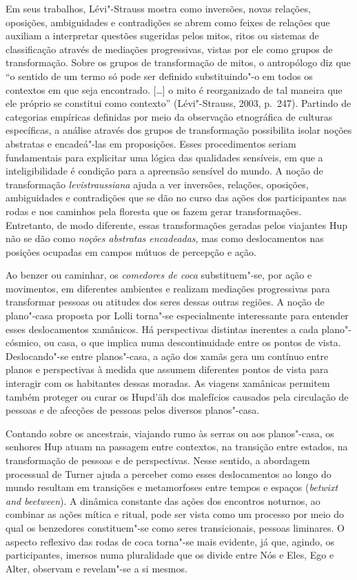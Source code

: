 Em seus trabalhos, Lévi"-Strauss mostra como inversões, novas relações,
oposições, ambiguidades e contradições se abrem como feixes de relações
que auxiliam a interpretar questões sugeridas pelos mitos, ritos ou
sistemas de classificação através de mediações progressivas, vistas por
ele como grupos de transformação. Sobre os grupos de transformação de
mitos, o antropólogo diz que ``o sentido de um termo só pode ser
definido substituindo"-o em todos os contextos em que seja encontrado.
{[}\ldots{}{]} o mito é reorganizado de tal maneira que ele próprio se
constitui como contexto'' (Lévi"-Strauss, 2003, p.~247). Partindo de
categorias empíricas definidas por meio da observação etnográfica de
culturas específicas, a análise através dos grupos de transformação
possibilita isolar noções abstratas e encadeá"-las em proposições. Esses
procedimentos seriam fundamentais para explicitar uma lógica das
qualidades sensíveis, em que a inteligibilidade é condição para a
apreensão sensível do mundo. A noção de transformação \textit{levistraussiana}
ajuda a ver inversões, relações, oposições, ambiguidades e contradições
que se dão no curso das ações dos participantes nas rodas e nos caminhos
pela floresta que os fazem gerar transformações. Entretanto, de modo
diferente, essas transformações geradas pelos viajantes Hup não se dão
como \textit{noções abstratas encadeadas}, mas como deslocamentos nas
posições ocupadas em campos mútuos de percepção e ação.

Ao benzer ou caminhar, os \textit{comedores de coca} substituem"-se, por ação
e movimentos, em diferentes ambientes e realizam mediações progressivas
para transformar pessoas ou atitudes dos seres dessas outras regiões. A
noção de plano"-casa proposta por Lolli torna"-se especialmente
interessante para entender esses deslocamentos xamânicos. Há
perspectivas distintas inerentes a cada plano"-cósmico, ou casa, o que
implica numa descontinuidade entre os pontos de vista. Deslocando"-se
entre planos"-casa, a ação dos xamãs gera um contínuo entre planos e
perspectivas à medida que assumem diferentes pontos de vista para
interagir com os habitantes dessas moradas. As viagens xamânicas
permitem também proteger ou curar os Hupd'äh dos malefícios causados
pela circulação de pessoas e de afecções de pessoas pelos diversos
planos"-casa.

Contando sobre os ancestrais, viajando rumo às serras ou aos
planos"-casa, os senhores Hup atuam na passagem entre contextos, na
transição entre estados, na transformação de pessoas e de perspectivas.
Nesse sentido, a abordagem processual de Turner ajuda a perceber como
esses deslocamentos ao longo do mundo resultam em transições e
metamorfoses entre tempos e espaços (\textit{betwixt and beetween}). A
dinâmica constante das ações dos encontros noturnos, ao combinar as
ações mítica e ritual, pode ser vista como um processo por meio do qual
os benzedores constituem"-se como seres transicionais, pessoas liminares.
O aspecto reflexivo das rodas de coca torna"-se mais evidente, já que,
agindo, os participantes, imersos numa pluralidade que os divide entre
Nós e Eles, Ego e Alter, observam e revelam"-se a si
mesmos.

